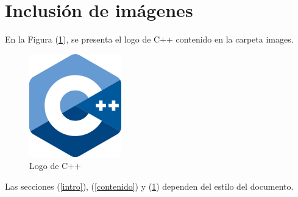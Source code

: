 \documentclass{article}
\begin{document}
\section{Inclusión de imágenes} \label{imagenes}

En la Figura (\ref{fig:cpplogo}), se presenta el logo de C++ contenido en la carpeta images.

\begin{figure}[h]
\includegraphics[width=4cm]{cpplogo.png}
\centering
\caption{Logo de C++}
\label{fig:cpplogo}
\end{figure}

Las secciones (\ref{intro}), (\ref{contenido}) y (\ref{imagenes}) dependen del estilo del documento.



\end{document}
